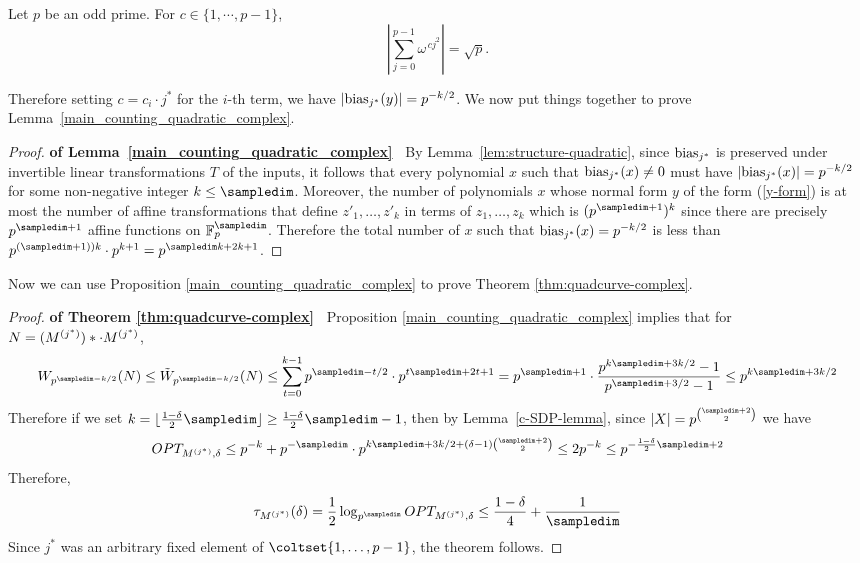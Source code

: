 \begin{sloppypar}
\begin{proposition}
Let $p$ be an odd prime.
For $c\in \{1,\cdots,p-1\}$,
\[
|\sum_{j=0}^{p-1}\omega^{\,cj^2}|=\sqrt{p}.
\]
\end{proposition}
\end{sloppypar}

Therefore setting $c=c_i\cdot j^*$ for the $i$-th term, we have $|\mathrm{bias}_{j^*}(y)|=p^{-k/2}$.  We now put things together to
prove Lemma~\ref{main_counting_quadratic_complex}.
\medskip

\begin{proof}{\bfseries\upshape of Lemma~\ref{main_counting_quadratic_complex}\ }
By Lemma~\ref{lem:structure-quadratic}, since $\mathrm{bias}_{j^*}$ is preserved under
invertible linear transformations $T$ of the inputs, 
it follows that every polynomial $x$ such that $\mathrm{bias}_{j^*}(x)\ne 0$ must have
$|\mathrm{bias}_{j^*}(x)|=p^{-k/2}$ for some non-negative integer $k\le \sampledim$.  
Moreover, the number of polynomials $x$ whose normal form $y$ of the form
(\ref{y-form})
is at most
the number of affine transformations that define $z'_1,\ldots,z'_k$ in
terms of $z_1,\ldots,z_k$ which is $(p^{\sampledim+1})^k$ since there are precisely
$p^{\sampledim+1}$ affine functions on $\mathbb{F}_p^\sampledim$. 
Therefore the total number of $x$ such that $\mathrm{bias}_{j^*}(x)=p^{-k/2}$ is less than 
$p^{(\sampledim+1))k}\cdot p^{k+1}=p^{\sampledim k+2k+1}$.
\end{proof}

Now we can use Proposition \ref{main_counting_quadratic_complex} to prove Theorem \ref{thm:quadcurve-complex}.
\medskip

\begin{proof}{\bfseries\upshape of Theorem \ref{thm:quadcurve-complex}\ }
Proposition \ref{main_counting_quadratic_complex} implies that
for $N=(M^{(j^*)})*\cdot M^{(j^*)}$,
\[
W_{p^{\sampledim-k/2}}(N)\leq \tilde W_{p^{\sampledim-k/2}}(N)\leq \sum_{t=0}^{k-1}p^{\sampledim-t/2}\cdot p^{t\sampledim+2t+1}=p^{\sampledim+1}\cdot \frac{p^{k\sampledim+3k/2}-1}{p^{\sampledim+3/2}-1}\leq p^{k\sampledim+3k/2}
\]
Therefore if we set $k=\lfloor \frac {1-\delta} 2 \sampledim\rfloor\geq \frac {1-\delta} 2 \sampledim-1$,
then by Lemma~\ref{c-SDP-lemma}, since $|X|=p^{\binom{\sampledim+2}2}$
we have
\[
OPT_{\mjs,\delta}\leq p^{-k}+p^{-\sampledim}\cdot p^{k\sampledim+3k/2+(\delta-1) \binom{\sampledim+2}2}\leq 2p^{-k}\leq p^{-\frac {1-\delta} 2 \sampledim+2}
\]
Therefore, 
\[
\tau_{\mjs}(\delta)=\frac 1 2\log_{p^\sampledim}OPT_{\mjs,\delta}\leq \frac {1-\delta}4+\frac 1 \sampledim
\]
Since $j^*$ was an arbitrary fixed element of $\coltset{1,\ldots,p-1}$, the 
theorem follows.
\end{proof}




